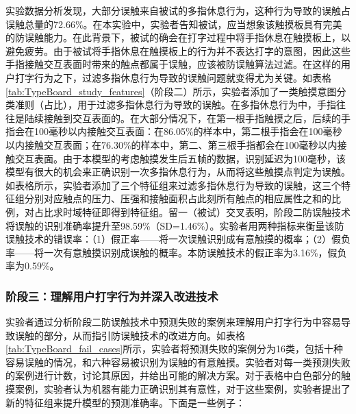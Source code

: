 实验数据分析发现，大部分误触来自被试的多指休息行为，这种行为导致的误触占误触总量的72.66\%。在本实验中，实验者告知被试，应当想象该触摸板具有完美的防误触能力。在此背景下，被试的确会在打字过程中将手指休息在触摸板上，以避免疲劳。由于被试将手指休息在触摸板上的行为并不表达打字的意图，因此这些手指接触交互表面时带来的触点都属于误触，应该被防误触算法过滤。在这样的用户打字行为之下，过滤多指休息行为导致的误触问题就变得尤为关键。如表格\ref{tab:TypeBoard_study_features}（阶段二）所示，实验者添加了一类触摸意图分类准则（占比），用于过滤多指休息行为导致的误触。在多指休息行为中，手指往往是陆续接触到交互表面的。在大部分情况下，在第一根手指触摸之后，后续的手指会在100毫秒以内接触交互表面：在86.05\%的样本中，第二根手指会在100毫秒以内接触交互表面；在76.30\%的样本中，第二、第三根手指都会在100毫秒以内接触交互表面。由于本模型的考虑触摸发生后五帧的数据，识别延迟为100毫秒，该模型有很大的机会来正确识别一次多指休息行为，从而将这些触摸点判定为误触。如表格所示，实验者添加了三个特征组来过滤多指休息行为导致的误触，这三个特征组分别对应触点的压力、压强和接触面积占此刻所有触点的相应属性之和的比例，对占比求时域特征即得到特征组。留一（被试）交叉表明，阶段二防误触技术将误触的识别准确率提升至98.59\%（SD=1.46\%）。实验者用两种指标来衡量该防误触技术的错误率：（1）假正率——将一次误触识别成有意触摸的概率；（2）假负率——将一次有意触摸识别成误触的概率。本防误触技术的假正率为3.16\%，假负率为0.59\%。

\subsubsection{阶段三：理解用户打字行为并深入改进技术}

实验者通过分析阶段二防误触技术中预测失败的案例来理解用户打字行为中容易导致误触的部分，从而指引防误触技术的改进方向。如表格\ref{tab:TypeBoard_fail_cases}所示，实验者将预测失败的案例分为16类，包括十种容易误触的情况，和六种容易被识别为误触的有意触摸。实验者对每一类预测失败的案例进行计数，讨论其原因，并给出可能的解决方案。对于表格中白色部分的触摸案例，实验者认为机器有能力正确识别其有意性，对于这些案例，实验者提出了新的特征组来提升模型的预测准确率。下面是一些例子：

